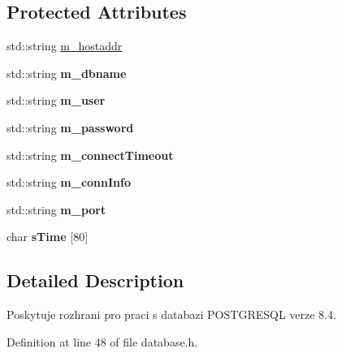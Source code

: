 \subsection*{Protected Attributes}
\begin{DoxyCompactItemize}
\item 
std::string \hyperlink{classDatabase_a73a3ea4197118649af11db64a0905f26}{m\_\-hostaddr}
\item 
\hypertarget{classDatabase_a70b977fa3e19a4246e7db483dcd8761d}{
std::string {\bfseries m\_\-dbname}}
\label{classDatabase_a70b977fa3e19a4246e7db483dcd8761d}

\item 
\hypertarget{classDatabase_a3c452d6af7dbb3a1d43a0af8a52925ca}{
std::string {\bfseries m\_\-user}}
\label{classDatabase_a3c452d6af7dbb3a1d43a0af8a52925ca}

\item 
\hypertarget{classDatabase_a3162a928df727ca310429e7e1898ce2e}{
std::string {\bfseries m\_\-password}}
\label{classDatabase_a3162a928df727ca310429e7e1898ce2e}

\item 
\hypertarget{classDatabase_a011133e8aee26f47cecc85bf23c4172f}{
std::string {\bfseries m\_\-connectTimeout}}
\label{classDatabase_a011133e8aee26f47cecc85bf23c4172f}

\item 
\hypertarget{classDatabase_a694c89f3fbedd3ca436a77879839a741}{
std::string {\bfseries m\_\-connInfo}}
\label{classDatabase_a694c89f3fbedd3ca436a77879839a741}

\item 
\hypertarget{classDatabase_a00d646c476f717ca940a96dd246e198d}{
std::string {\bfseries m\_\-port}}
\label{classDatabase_a00d646c476f717ca940a96dd246e198d}

\item 
\hypertarget{classDatabase_ab85622620a91d68830ee429f0cea4eb9}{
char {\bfseries sTime} \mbox{[}80\mbox{]}}
\label{classDatabase_ab85622620a91d68830ee429f0cea4eb9}

\end{DoxyCompactItemize}


\subsection{Detailed Description}
Poskytuje rozhrani pro praci s databazi POSTGRESQL verze 8.4. 

Definition at line 48 of file database.h.



